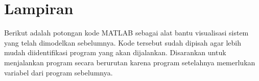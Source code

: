 \documentclass{article}
\begin{document}
\pagebreak
\section*{Lampiran}
Berikut adalah potongan kode MATLAB sebagai alat bantu visualisasi sistem yang telah dimodelkan sebelumnya. Kode tersebut sudah dipisah agar lebih mudah diidentifikasi program yang akan dijalankan. Disarankan untuk menjalankan program secara berurutan karena program setelahnya memerlukan variabel dari program sebelumnya.
\begin{lstlisting}[caption={Penyelesaian umum PD}]
\end{lstlisting}

\begin{lstlisting}[caption={Desain kontrol}]
\end{lstlisting}

\begin{lstlisting}[caption={Desain observer tanpa kontrol dan RMSE-nya}]
\end{lstlisting}

\begin{lstlisting}[caption={Desain observer dengan kontrol dan RMSE-nya}]
\end{lstlisting}
\end{document}
